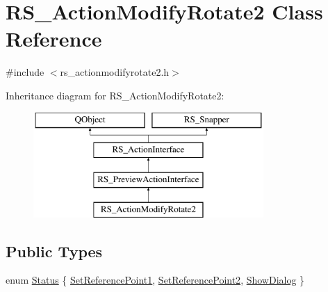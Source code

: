 \hypertarget{classRS__ActionModifyRotate2}{\section{R\-S\-\_\-\-Action\-Modify\-Rotate2 Class Reference}
\label{classRS__ActionModifyRotate2}
}


{\ttfamily \#include $<$rs\-\_\-actionmodifyrotate2.\-h$>$}

Inheritance diagram for R\-S\-\_\-\-Action\-Modify\-Rotate2\-:\begin{figure}[H]
\begin{center}
\leavevmode
\includegraphics[height=4.000000cm]{classRS__ActionModifyRotate2}
\end{center}
\end{figure}
\subsection*{Public Types}
\begin{DoxyCompactItemize}
\item 
enum \hyperlink{classRS__ActionModifyRotate2_aaee5e6c9609bd14e7d4d702c505d0b7d}{Status} \{ \hyperlink{classRS__ActionModifyRotate2_aaee5e6c9609bd14e7d4d702c505d0b7da088dfc2eaa43bc219b9b6aea3d6f02bc}{Set\-Reference\-Point1}, 
\hyperlink{classRS__ActionModifyRotate2_aaee5e6c9609bd14e7d4d702c505d0b7da21d09850027cfda6c8989a043f209413}{Set\-Reference\-Point2}, 
\hyperlink{classRS__ActionModifyRotate2_aaee5e6c9609bd14e7d4d702c505d0b7daecfe7843150327ed647246d82a404675}{Show\-Dialog}
 \}
\end{DoxyCompactItemize}
